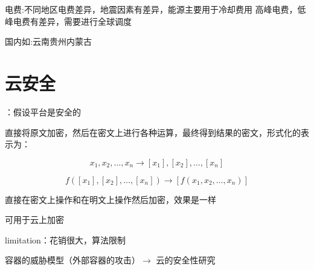 电费:不同地区电费差异，地震️因素有差异，能源主要用于冷却费用
高峰电费，低峰电费有差异，需要进行全球调度

国内如:云南贵州内蒙古



\chapter{云安全}

：假设平台是安全的

\begin{definition}
    直接将原文加密，然后在密文上进行各种运算，最终得到结果的密文，形式化的表示为：

    $$ x_{1}, x_{2}, \ldots, x_{n} \rightarrow\left[x_{1}\right],\left[x_{2}\right], \ldots,\left[x_{n}\right] $$

    $$ f\left(\left[x_{1}\right],\left[x_{2}\right], \ldots,\left[x_{n}\right]\right) \rightarrow\left[f\left(x_{1}, x_{2}, \ldots, x_{n}\right)\right] $$
    
    直接在密文上操作和在明文上操作然后加密，效果是一样

    可用于云上加密

limitation：花销很大，算法限制
\end{definition}

容器的威胁模型（外部容器的攻击）$\rightarrow$ 云的安全性研究
